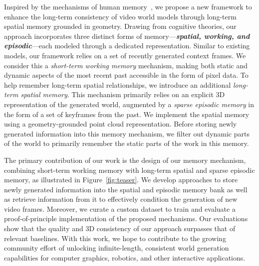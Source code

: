 Inspired by the mechanisms of human memory~\cite{baddeley2013essentials}, we propose a new framework to enhance the long-term consistency of video world models through long-term spatial memory grounded in geometry. Drawing from cognitive theories, our approach incorporates three distinct forms of memory—\textbf{\textit{spatial, working, and episodic}}—each modeled through a dedicated representation. Similar to existing models, our framework relies on a set of recently generated context frames. We consider this a \emph{short-term working memory} mechanism, making both static and dynamic aspects of the most recent past accessible in the form of pixel data. To help remember long-term spatial relationships, we introduce an additional \emph{long-term spatial memory}. This mechanism primarily relies on an explicit 3D representation of the generated world, augmented by a \textit{sparse episodic memory} in the form of a set of keyframes from the past. We implement the spatial memory using a geometry-grounded point cloud representation. Before storing newly generated information into this memory mechanism, we filter out dynamic parts of the world to primarily remember the static parts of the work in this memory.  

The primary contribution of our work is the design of our memory mechanism, combining short-term working memory with long-term spatial and sparse episodic memory, as illustrated in Figure~\ref{fig:teaser}. We develop approaches to store newly generated information into the spatial and episodic memory bank as well as retrieve information from it to effectively condition the generation of new video frames. Moreover, we curate a custom dataset to train and evaluate a proof-of-principle implementation of the proposed mechanisms. Our evaluations show that the quality and 3D consistency of our approach surpasses that of relevant baselines. With this work, we hope to contribute to the growing community effort of unlocking infinite-length, consistent world generation capabilities for computer graphics, robotics, and other interactive applications.

\endinput

\tong{\textbf{An expanded version of this part:}
The primary contribution of our work lies in the design of a spatial long-term and complementary memory mechanism, detailed as follows:
First, we iteratively generate new video frames and perform learnable 3D reconstruction to obtain dynamic point maps online. These maps are then filtered to retain only static points, which are fused with sparsely sampled reference frames to construct the spatial memory bank.
Second, we develop a video generative model conditioned on three key elements: static geometry guidance, recent context frames, and historical reference frames. This enables camera-controllable, memory-aware, and 3D-consistent dynamic video generation guided by text instructions.
Additionally, we curate a custom dataset derived from MiraData, containing 90K paired samples, to support both training and evaluation of our conditioned video generation framework.


}

